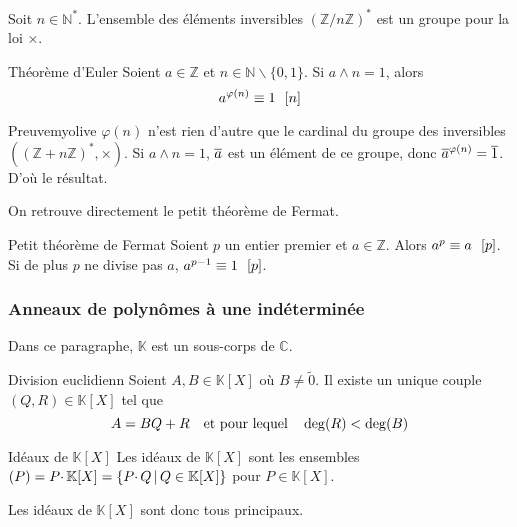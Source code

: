     \begin{lem}{}{}
        Soit $n \in \mathbb{N}^*$. L’ensemble des éléments inversibles $(\mathbb{Z} / n \mathbb{Z})^*$ est un groupe pour la loi $\times$.
    \end{lem}

    \begin{prop}{Théorème d’Euler}{}
        Soient $a \in \mathbb{Z}$ et $n \in \mathbb{N} \backslash \{0,1\}$. Si $a \wedge n = 1$, alors 
        \[ \eqmodulo{a^{\varphi(n)}}{1}{n} \]   
    \end{prop}

    \begin{demo}{Preuve}{myolive}
        $\varphi(n)$ n’est rien d’autre que le cardinal du groupe des inversibles $((\mathbb{Z} + n \mathbb{Z})^*, \times)$. Si $a \wedge n = 1$, $\overline{a}$ est un élément de ce groupe, donc $\overline{a}^{\varphi(n)} = \overline{1}$. D’où le résultat.
    \end{demo}

    On retrouve directement le petit théorème de Fermat.

    \begin{coro}{Petit théorème de Fermat}{}
        Soient $p$ un entier premier et $a \in \mathbb{Z}$. Alors $\eqmodulo{a^p}{a}{p}$. Si de plus $p$ ne divise pas $a$, $\eqmodulo{a^{p-1}}{1}{p}$.
    \end{coro}

    \subsubsection{Anneaux de polynômes à une indéterminée}

    Dans ce paragraphe, $\mathbb{K}$ est un sous-corps de $\mathbb{C}$.

    \begin{theo}{Division euclidienn}{}
        Soient $A,B \in \mathbb{K}[X]$ où $B \neq \tilde{0}$. Il existe un unique couple $(Q,R) \in \mathbb{K}[X]$ tel que 
        \[ A = BQ + R \quad \text{et pour lequel} \quad \deg(R) < \deg(B) \]  
    \end{theo}

    \begin{theo}{Idéaux de $\mathbb{K}[X]$}{}
        Les idéaux de $\mathbb{K}[X]$ sont les ensembles $(P) = P \cdotp \mathbb{K}[X] = \left\{P \cdotp Q \, \middle| \, Q \in \mathbb{K}[X]\right\}$ pour $P \in \mathbb{K}[X]$.
    \end{theo}

    Les idéaux de $\mathbb{K}[X]$ sont donc tous principaux.

